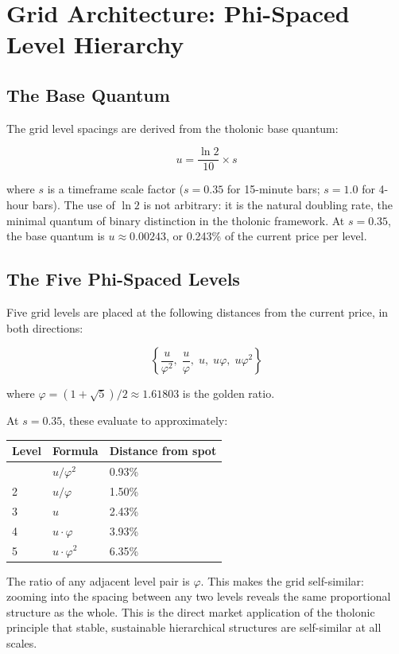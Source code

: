 \documentclass[12pt]{article}
\begin{document}
\section{Grid Architecture: Phi-Spaced Level Hierarchy}\label{grid-architecture-phi-spaced-level-hierarchy}

\subsection{The Base Quantum}\label{the-base-quantum}

The grid level spacings are derived from the tholonic base quantum:

\[u = \frac{\ln 2}{10} \times s\]

where \(s\) is a timeframe scale factor (\(s = 0.35\) for 15-minute
bars; \(s = 1.0\) for 4-hour bars). The use of \(\ln 2\) is not
arbitrary: it is the natural doubling rate, the minimal quantum of
binary distinction in the tholonic framework. At \(s = 0.35\), the base
quantum is \(u \approx 0.00243\), or 0.243\% of the current price per
level.

\subsection{The Five Phi-Spaced Levels}\label{the-five-phi-spaced-levels}

Five grid levels are placed at the following distances from the current
price, in both directions:

\[\left\{\frac{u}{\varphi^2},\; \frac{u}{\varphi},\; u,\; u\varphi,\; u\varphi^2\right\}\]

where \(\varphi = (1 + \sqrt{5})/2 \approx 1.61803\) is the golden
ratio.

At \(s = 0.35\), these evaluate to approximately:

\begin{longtable}[]{@{}lll@{}}
\toprule\noalign{}
Level & Formula & Distance from spot \\
\midrule\noalign{}
\endhead
\bottomrule\noalign{}
\endlastfoot
1 & \(u / \varphi^2\) & 0.93\% \\
2 & \(u / \varphi\) & 1.50\% \\
3 & \(u\) & 2.43\% \\
4 & \(u \cdot \varphi\) & 3.93\% \\
5 & \(u \cdot \varphi^2\) & 6.35\% \\
\end{longtable}

The ratio of any adjacent level pair is \(\varphi\). This makes the grid
self-similar: zooming into the spacing between any two levels reveals
the same proportional structure as the whole. This is the direct market
application of the tholonic principle that stable, sustainable
hierarchical structures are self-similar at all scales.
\end{document}
